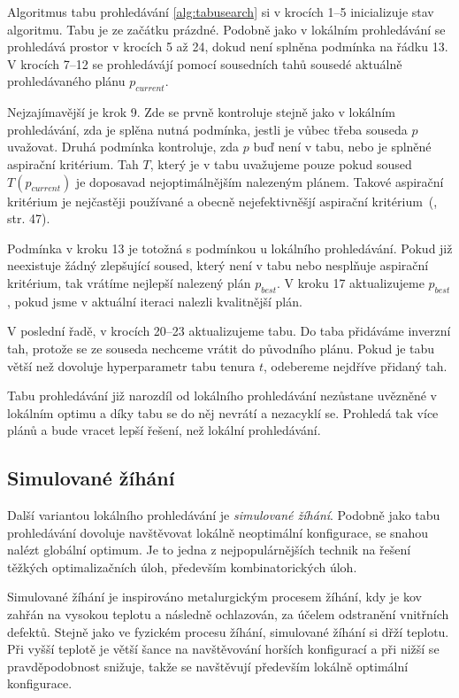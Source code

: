 Algoritmus tabu prohledávání \ref{alg:tabusearch} si v krocích 1--5 inicializuje stav algoritmu. Tabu je ze začátku prázdné.
Podobně jako v lokálním prohledávání se prohledává prostor v krocích 5 až 24, dokud není splněna podmínka na řádku 13.
V krocích 7--12 se prohledávájí pomocí sousedních tahů sousedé aktuálně prohledávaného plánu $p_{current}$. 

Nejzajímavější je krok 9. Zde se prvně kontroluje stejně jako v lokálním prohledávání, zda je splěna nutná podmínka, jestli je vůbec třeba souseda $p$ uvažovat.
Druhá podmínka kontroluje, zda $p$ buď není v tabu, nebo je splněné aspirační kritérium.
Tah $T$, který je v tabu uvažujeme pouze pokud soused $T(p_{current})$ je doposavad nejoptimálnějším nalezeným plánem.
Takové aspirační kritérium je nejčastěji používané a obecně nejefektivněšjí aspirační kritérium~(\citet{GlovKoch03}, str. 47).

Podmínka v kroku 13 je totožná s podmínkou u lokálního prohledávání.
Pokud již neexistuje žádný zlepšující soused, který není v tabu nebo nesplňuje aspirační kritérium, tak vrátíme nejlepší nalezený plán $p_{best}$.
V kroku 17 aktualizujeme $p_{best}$, pokud jsme v aktuální iteraci nalezli kvalitnější plán.

V poslední řadě, v krocích 20--23 aktualizujeme tabu.
Do taba přidáváme inverzní tah, protože se ze souseda nechceme vrátit do původního plánu.
Pokud je tabu větší než dovoluje hyperparametr tabu tenura $t$, odebereme nejdříve přidaný tah.

Tabu prohledávání již narozdíl od lokálního prohledávání nezůstane uvězněné v lokálním optimu a díky tabu se do něj nevrátí a nezacyklí se.
Prohledá tak více plánů a bude vracet lepší řešení, než lokální prohledávání.

\subsection{Simulované žíhání}

Další variantou lokálního prohledávání je \textit{simulované žíhání}.
Podobně jako tabu prohledávání dovoluje navštěvovat lokálně neoptimální konfigurace, se snahou nalézt globální optimum.
Je to jedna z nejpopulárnějších technik na řešení těžkých optimalizačních úloh, především kombinatorických úloh.

Simulované žíhání je inspirováno metalurgickým procesem žíhání, kdy je kov zahřán na vysokou teplotu
a následně ochlazován, za účelem odstranění vnitřních defektů.
Stejně jako ve fyzickém procesu žíhání, simulované žíhání si dřží teplotu.
Při vyšší teplotě je větší šance na navštěvování horších konfigurací a při nižší se pravděpodobnost snižuje, takže se navštěvují především lokálně optimální konfigurace.

